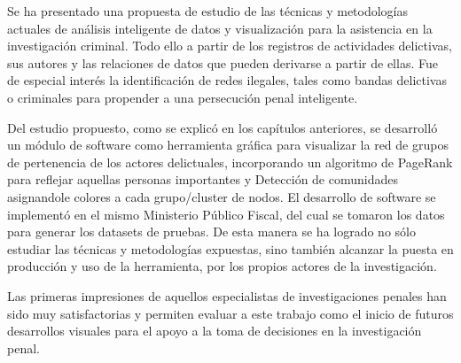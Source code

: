 Se ha presentado una propuesta de estudio de las técnicas y metodologías actuales de análisis inteligente de datos y visualización para la asistencia en la investigación criminal. Todo ello a partir de los registros de actividades delictivas, sus autores y las relaciones de datos que pueden derivarse a partir de ellas. Fue de especial interés la identificación de redes ilegales, tales como bandas delictivas o criminales para propender a una persecución penal inteligente.

Del estudio propuesto, como se explicó en los capítulos anteriores, se desarrolló un módulo de software como herramienta gráfica para visualizar la red de grupos de pertenencia de los actores delictuales, incorporando un algoritmo de PageRank para reflejar aquellas personas importantes y Detección de comunidades asignandole colores a cada grupo/cluster de nodos.
El desarrollo de software se implementó en el mismo Ministerio Público Fiscal, del cual se tomaron los datos para generar los datasets de pruebas. De esta manera se ha logrado no sólo estudiar las técnicas y metodologías expuestas, sino también alcanzar la puesta en producción y uso de la herramienta, por los propios actores de la investigación.

Las primeras impresiones de aquellos especialistas de investigaciones penales han sido muy satisfactorias y permiten evaluar a este trabajo como el inicio de futuros desarrollos visuales para el apoyo a la toma de decisiones en la investigación penal.
